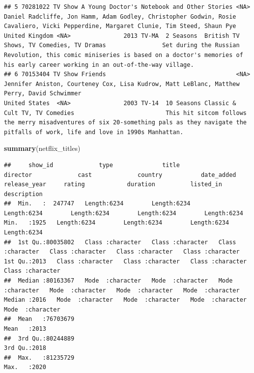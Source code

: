 \documentclass[
]{article}
\newenvironment{Shaded}{\begin{snugshade}}{\end{snugshade}}
\newcommand{\KeywordTok}[1]{\textcolor[rgb]{0.13,0.29,0.53}{\textbf{#1}}}
\newcommand{\NormalTok}[1]{#1}
\begin{document}
\begin{verbatim}
## 5 70281022 TV Show A Young Doctor's Notebook and Other Stories <NA>     Daniel Radcliffe, Jon Hamm, Adam Godley, Christopher Godwin, Rosie Cavaliero, Vicki Pepperdine, Margaret Clunie, Tim Steed, Shaun Pye               United Kingdom <NA>               2013 TV-MA  2 Seasons  British TV Shows, TV Comedies, TV Dramas                Set during the Russian Revolution, this comic miniseries is based on a doctor's memories of his early career working in an out-of-the-way village.    
## 6 70153404 TV Show Friends                                     <NA>     Jennifer Aniston, Courteney Cox, Lisa Kudrow, Matt LeBlanc, Matthew Perry, David Schwimmer                                                          United States  <NA>               2003 TV-14  10 Seasons Classic & Cult TV, TV Comedies                          This hit sitcom follows the merry misadventures of six 20-something pals as they navigate the pitfalls of work, life and love in 1990s Manhattan.
\end{verbatim}

\begin{Shaded}
\begin{Highlighting}[]
\KeywordTok{summary}\NormalTok{(netflix_titles)}
\end{Highlighting}
\end{Shaded}

\begin{verbatim}
##     show_id             type              title             director             cast             country           date_added         release_year     rating            duration          listed_in         description       
##  Min.   :  247747   Length:6234        Length:6234        Length:6234        Length:6234        Length:6234        Length:6234        Min.   :1925   Length:6234        Length:6234        Length:6234        Length:6234       
##  1st Qu.:80035802   Class :character   Class :character   Class :character   Class :character   Class :character   Class :character   1st Qu.:2013   Class :character   Class :character   Class :character   Class :character  
##  Median :80163367   Mode  :character   Mode  :character   Mode  :character   Mode  :character   Mode  :character   Mode  :character   Median :2016   Mode  :character   Mode  :character   Mode  :character   Mode  :character  
##  Mean   :76703679                                                                                                                     Mean   :2013                                                                              
##  3rd Qu.:80244889                                                                                                                     3rd Qu.:2018                                                                              
##  Max.   :81235729                                                                                                                     Max.   :2020
\end{verbatim}
\end{document}
